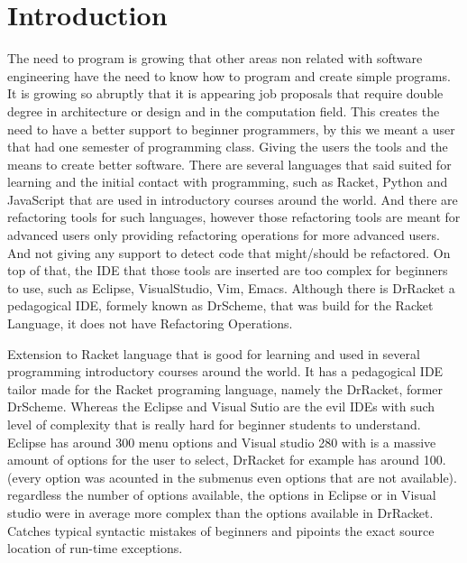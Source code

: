 \section{Introduction}



The need to program is growing that other areas non related with software engineering
have the need to know how to program and create simple programs. It is growing
so abruptly that it is appearing job proposals that require double degree in
architecture or design and in the computation field.
This creates the need to have a better support to beginner programmers, by this
we meant a user that had one semester of programming class. Giving the users
the tools and the means to create better software.
There are several languages that said suited for learning and the initial contact
with programming, such as Racket, Python and JavaScript that are used in introductory
courses around the world.
And there are refactoring tools for such languages, however those refactoring tools
are meant for advanced users only providing refactoring operations for more advanced
users. And not giving any support to detect code that might/should be refactored.
On top of that, the IDE that those tools are inserted are too complex for beginners
to use, such as Eclipse, VisualStudio, Vim, Emacs. %
Although there is DrRacket a pedagogical IDE, formely known as DrScheme, that was
build for the Racket Language, it does not have Refactoring Operations.


Extension to Racket language that is good for learning and used in several
programming introductory courses around the world.
It has a pedagogical IDE tailor made for the Racket programing language, namely
the DrRacket, former DrScheme.
Whereas the Eclipse and Visual Sutio are the evil IDEs with such level of
complexity that is really hard for beginner students to understand.
Eclipse has around 300 menu options and Visual studio 280 with is a massive amount
of options for the user to select, DrRacket for example has around 100. (every option was acounted in the submenus
even options that are not available). regardless the number of options available,
the options in Eclipse or in Visual studio were in average more complex than the
options available in DrRacket.
Catches typical syntactic mistakes of beginners and pipoints the exact source location
of run-time exceptions.

